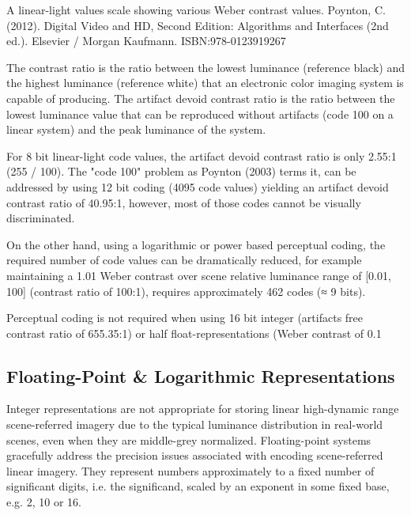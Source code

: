 A linear-light values scale showing various Weber contrast values.
Poynton, C. (2012). Digital Video and HD, Second Edition: Algorithms and Interfaces (2nd ed.). Elsevier / Morgan Kaufmann. ISBN:978-0123919267


The contrast ratio is the ratio between the lowest luminance (reference black) and the highest luminance (reference white) that an electronic color imaging system is capable of producing. The artifact devoid contrast ratio is the ratio between the lowest luminance value that can be reproduced without artifacts (code 100 on a linear system) and the peak luminance of the system.

For 8 bit linear-light code values, the artifact devoid contrast ratio is only 2.55:1 (255 / 100). The "code 100" problem as Poynton (2003) terms it, can be addressed by using 12 bit coding (4095 code values) yielding an artifact devoid contrast ratio of 40.95:1, however, most of those codes cannot be visually discriminated.

On the other hand, using a logarithmic or power based perceptual coding, the required number of code values can be dramatically reduced, for example maintaining a 1.01 Weber contrast over scene relative luminance range of [0.01, 100] (contrast ratio of 100:1), requires approximately 462 codes (≈ 9 bits).


Perceptual coding is not required when using 16 bit integer (artifacts free contrast ratio of 655.35:1) or half float-representations (Weber contrast of 0.1%

\subsection{Floating-Point & Logarithmic Representations}

Integer representations are not appropriate for storing linear high-dynamic range scene-referred imagery due to the typical luminance distribution in real-world scenes, even when they are middle-grey normalized. Floating-point systems gracefully address the precision issues associated with encoding scene-referred linear imagery. They represent numbers approximately to a fixed number of significant digits, i.e. the significand, scaled by an exponent in some fixed base, e.g. 2, 10 or 16.

